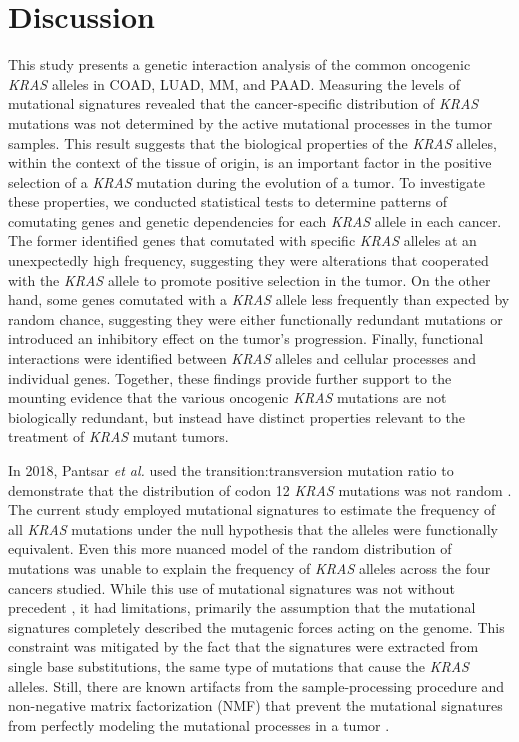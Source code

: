 \documentclass[english, 10pt, letterpaper]{article}
\newcommand{\KRAS}{\emph{KRAS}}
\begin{document}
\section*{Discussion}

This study presents a genetic interaction analysis of the common oncogenic \KRAS{} alleles in COAD, LUAD, MM, and PAAD.
Measuring the levels of mutational signatures revealed that the cancer-specific distribution of \KRAS{} mutations was not determined by the active mutational processes in the tumor samples.
This result suggests that the biological properties of the \KRAS{} alleles, within the context of the tissue of origin, is an important factor in the positive selection of a \KRAS{} mutation during the evolution of a tumor.
To investigate these properties, we conducted statistical tests to determine patterns of comutating genes and genetic dependencies for each \KRAS{} allele in each cancer.
The former identified genes that comutated with specific \KRAS{} alleles at an unexpectedly high frequency, suggesting they were alterations that cooperated with the \KRAS{} allele to promote positive selection in the tumor.
On the other hand, some genes comutated with a \KRAS{} allele less frequently than expected by random chance, suggesting they were either functionally redundant mutations or introduced an inhibitory effect on the tumor's progression.
Finally, functional interactions were identified between \KRAS{} alleles and cellular processes and individual genes.
Together, these findings provide further support to the mounting evidence that the various oncogenic \KRAS{} mutations are not biologically redundant, but instead have distinct properties relevant to the treatment of \KRAS{} mutant tumors.

In 2018, Pantsar \emph{et al.} used the transition:transversion mutation ratio to demonstrate that the distribution of codon 12 \KRAS{} mutations was not random \cite{Pantsar2018}.
The current study employed mutational signatures to estimate the frequency of all \KRAS{} mutations under the null hypothesis that the alleles were functionally equivalent.
Even this more nuanced model of the random distribution of mutations was unable to explain the frequency of \KRAS{} alleles across the four cancers studied.
While this use of mutational signatures was not without precedent \cite{Dietlein2020IdentificationContext., Bergstrom2020GeneratingSigProfilerSimulator}, it had limitations, primarily the assumption that the mutational signatures completely described the mutagenic forces acting on the genome.
This constraint was mitigated by the fact that the signatures were extracted from single base substitutions, the same type of mutations that cause the \KRAS{} alleles.
Still, there are known artifacts from the sample-processing procedure and non-negative matrix factorization (NMF) that prevent the mutational signatures from perfectly modeling the mutational processes in a tumor \cite{Alexandrov2015, Gawad2016, Alexandrov2020TheCancer.}.
\end{document}
